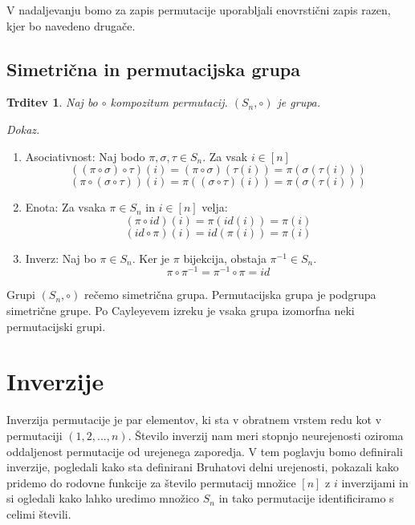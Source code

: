 \documentclass[a4paper, 12pt]{book}
\newtheorem{trditev}{Trditev}[chapter]
\newenvironment{dokaz}{\emph{Dokaz.}\ }{\hspace{\fill}{$\Box$}}
\begin{document}
V nadaljevanju bomo za zapis permutacije uporabljali enovrstični zapis razen, kjer bo navedeno drugače.

\section{Simetrična in permutacijska grupa}

\begin{trditev}
    Naj bo $\circ$ kompozitum permutacij. $(S_n, \circ)$ je grupa.
\end{trditev}
\begin{dokaz}
    \begin{enumerate}
        \item Asociativnost: Naj bodo $\pi, \sigma, \tau \in S_n$. Za vsak $i \in [n]$ 
        \[
            ((\pi \circ \sigma) \circ \tau)(i) = (\pi \circ \sigma)(\tau(i)) = \pi(\sigma(\tau(i)))
        \]
        \[
            (\pi \circ (\sigma \circ \tau))(i) = \pi((\sigma \circ \tau)(i)) = \pi(\sigma(\tau(i))) 
        \]
        \item Enota: Za vsaka $\pi \in S_n$ in $i \in [n]$ velja:
        \[
            (\pi \circ id)(i) = \pi(id(i)) = \pi(i)
        \]
        \[
            (id \circ \pi)(i) = id(\pi(i)) = \pi(i)
        \]
        \item Inverz: Naj bo $\pi \in S_n$. Ker je $\pi$ bijekcija, obstaja $\pi^{-1} \in S_n$.
        \[
            \pi \circ \pi^{-1} = \pi^{-1} \circ \pi = id
        \]
    \end{enumerate}
\end{dokaz}

Grupi $(S_n, \circ)$ rečemo simetrična grupa. Permutacijska grupa je podgrupa simetrične grupe. Po Cayleyevem izreku je vsaka grupa izomorfna neki permutacijski grupi.


\chapter{ Inverzije }

Inverzija permutacije je par elementov, ki sta v obratnem vrstem redu kot v permutaciji $(1, 2,..., n)$. Število inverzij nam meri stopnjo neurejenosti oziroma oddaljenost permutacije od urejenega zaporedja. V tem poglavju bomo definirali inverzije, pogledali kako sta definirani Bruhatovi delni urejenosti, pokazali kako pridemo do rodovne funkcije za število permutacij množice $[n]$ z $i$ inverzijami in si ogledali kako lahko uredimo množico $S_n$ in tako permutacije identificiramo s celimi števili.
\end{document}
